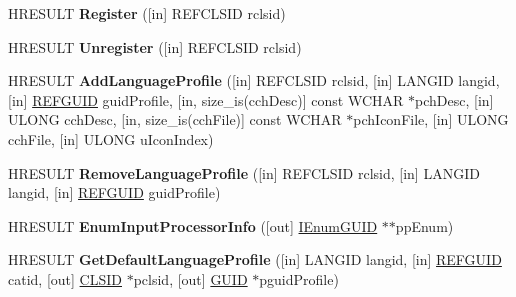 \begin{DoxyCompactItemize}
\item 
\mbox{\label{interfaceuuid_a2dad55e9523d4261a1f86fec7aa799c4}} 
H\+R\+E\+S\+U\+LT {\bfseries Register} (\mbox{[}in\mbox{]} R\+E\+F\+C\+L\+S\+ID rclsid)
\item 
\mbox{\label{interfaceuuid_a619ac3cecd78d99449b3bd611e61075f}} 
H\+R\+E\+S\+U\+LT {\bfseries Unregister} (\mbox{[}in\mbox{]} R\+E\+F\+C\+L\+S\+ID rclsid)
\item 
\mbox{\label{interfaceuuid_ac74d6b173c438708ba8ea81b6ab6172b}} 
H\+R\+E\+S\+U\+LT {\bfseries Add\+Language\+Profile} (\mbox{[}in\mbox{]} R\+E\+F\+C\+L\+S\+ID rclsid, \mbox{[}in\mbox{]} L\+A\+N\+G\+ID langid, \mbox{[}in\mbox{]} \hyperlink{struct___g_u_i_d}{R\+E\+F\+G\+U\+ID} guid\+Profile, \mbox{[}in, size\+\_\+is(cch\+Desc)\mbox{]} const W\+C\+H\+AR $\ast$pch\+Desc, \mbox{[}in\mbox{]} U\+L\+O\+NG cch\+Desc, \mbox{[}in, size\+\_\+is(cch\+File)\mbox{]} const W\+C\+H\+AR $\ast$pch\+Icon\+File, \mbox{[}in\mbox{]} U\+L\+O\+NG cch\+File, \mbox{[}in\mbox{]} U\+L\+O\+NG u\+Icon\+Index)
\item 
\mbox{\label{interfaceuuid_a49042a7db4b72f3db267027bb9eab9fc}} 
H\+R\+E\+S\+U\+LT {\bfseries Remove\+Language\+Profile} (\mbox{[}in\mbox{]} R\+E\+F\+C\+L\+S\+ID rclsid, \mbox{[}in\mbox{]} L\+A\+N\+G\+ID langid, \mbox{[}in\mbox{]} \hyperlink{struct___g_u_i_d}{R\+E\+F\+G\+U\+ID} guid\+Profile)
\item 
\mbox{\label{interfaceuuid_ab7318e50aa68514db5be8fc732845e86}} 
H\+R\+E\+S\+U\+LT {\bfseries Enum\+Input\+Processor\+Info} (\mbox{[}out\mbox{]} \hyperlink{interface_i_enum_g_u_i_d}{I\+Enum\+G\+U\+ID} $\ast$$\ast$pp\+Enum)
\item 
\mbox{\label{interfaceuuid_a286e88e8b6f4e786bb9a637565cbc168}} 
H\+R\+E\+S\+U\+LT {\bfseries Get\+Default\+Language\+Profile} (\mbox{[}in\mbox{]} L\+A\+N\+G\+ID langid, \mbox{[}in\mbox{]} \hyperlink{struct___g_u_i_d}{R\+E\+F\+G\+U\+ID} catid, \mbox{[}out\mbox{]} \hyperlink{struct___i_i_d}{C\+L\+S\+ID} $\ast$pclsid, \mbox{[}out\mbox{]} \hyperlink{interface_g_u_i_d}{G\+U\+ID} $\ast$pguid\+Profile)
\item 
\mbox{\label{interfaceuuid_a858e83b50ca80de71b3e21d097405bec}} 
$$
\end{DoxyCompactItemize}
